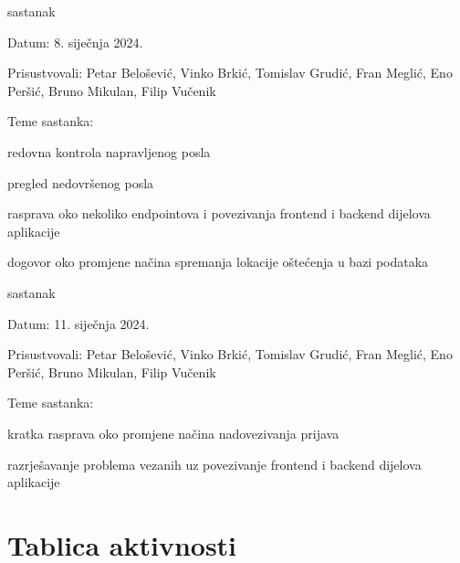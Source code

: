 \begin{packed_enum}
			\item  sastanak
			\item[] \begin{packed_item}
				\item Datum: 8. siječnja 2024.
				\item Prisustvovali: Petar Belošević, Vinko Brkić, Tomislav Grudić, Fran Meglić, Eno Peršić, Bruno Mikulan, Filip Vučenik
				\item Teme sastanka:
				\begin{packed_item}
					\item redovna kontrola napravljenog posla
					\item pregled nedovršenog posla
					\item rasprava oko nekoliko endpointova i povezivanja frontend i backend dijelova aplikacije
					\item dogovor oko promjene načina spremanja lokacije oštećenja u bazi podataka
				\end{packed_item}
			\end{packed_item}
			
			\item  sastanak
			\item[] \begin{packed_item}
				\item Datum: 11. siječnja 2024.
				\item Prisustvovali: Petar Belošević, Vinko Brkić, Tomislav Grudić, Fran Meglić, Eno Peršić, Bruno Mikulan, Filip Vučenik
				\item Teme sastanka:
				\begin{packed_item}
					\item kratka rasprava oko promjene načina nadovezivanja prijava
					\item razrješavanje problema vezanih uz povezivanje frontend i backend dijelova aplikacije
				\end{packed_item}
			\end{packed_item}
			
		\end{packed_enum}
		
		\eject
		\section*{Tablica aktivnosti}

